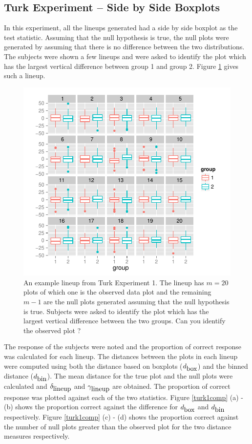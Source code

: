 \documentclass[12]{article}
\begin{document}
\subsection{Turk Experiment -- Side by Side Boxplots}

In this experiment, all the lineups generated had a side by side boxplot as the test statistic. Assuming that the null hypothesis is true, the null plots were generated by assuming that there is no difference between the two distributions. The subjects were shown a few lineups and were asked to identify the plot which has the largest vertical difference between group 1 and group 2. Figure \ref{turk1} gives such a lineup. \\

\begin{figure}[htbp]
\centering
\includegraphics[width=.5\textwidth]{turk1-example.pdf}
\caption{An example lineup from Turk Experiment 1. The lineup has $m = 20$ plots of which one is the observed data plot and the remaining $m - 1$ are the null plots generated assuming that the null hypothesis is true. Subjects were asked to identify the plot which has the largest vertical difference between the two groups. Can you identify the observed plot ?}
\label{turk1}
\end{figure}

The response of the subjects were noted and the proportion of correct response was calculated for each lineup. The distances between the plots in each lineup were computed using both the distance based on boxplots ($d_{\hbox{box}}$) and the binned distance ($d_{\hbox{bin}}$). The mean distance for the true plot and the null plots were calculated and $\delta_{\hbox{lineup}}$ and $\gamma_{\hbox{lineup}}$ are obtained. The proportion of correct response was plotted against each of the two statistics. Figure \ref{turk1comp} (a) - (b) shows the proportion correct against the difference for $d_{\hbox{box}}$ and $d_{\hbox{bin}}$ respectively. Figure \ref{turk1comp} (c) - (d) shows the proportion correct against the number of null plots greater than the observed plot for the two distance measures respectively. 
\end{document}

